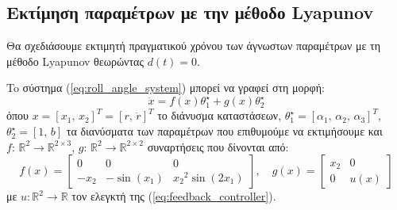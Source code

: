 \documentclass[a4paper,12pt]{article}
\begin{document}
\subsection*{Εκτίμηση παραμέτρων με την μέθοδο Lyapunov}

Θα σχεδιάσουμε εκτιμητή πραγματικού χρόνου των άγνωστων παραμέτρων με τη μέθοδο 
Lyapunov θεωρώντας $d(t) = 0$.

To σύστημα (\ref{eq:roll_angle_system}) μπορεί να γραφεί στη μορφή:
\begin{equation}
    \dot{x} = f(x)\theta_1^{\star} + g(x) \theta_2^{\star}
    \label{eq:eq:roll_angle_system_2}
\end{equation}
όπου $x = [x_1, \, x_2]^T = [r,\,\dot{r}]^T$ το διάνυσμα καταστάσεων, 
$\theta_1^{\star} = [\alpha_1,\,\alpha_2,\,\alpha_3]^T$, $\theta_2^{\star} = [1, \, b]$ τα διανύσματα των
παραμέτρων που επιθυμούμε να εκτιμήσουμε και $f:\, \mathbb{R}^2 \to \mathbb{R}^{2 \times 3}$, 
$g:\, \mathbb{R}^2 \to \mathbb{R}^{2 \times 2}$ συναρτήσεις που δίνονται από:
\begin{equation}
    f(x) = 
    \begin{bmatrix}
        0 & 0 & 0 \\
        -x_2 & - \sin(x_1) & {x_2}^2 \sin(2 x_1)
    \end{bmatrix}, \quad
    g(x) = 
    \begin{bmatrix}
        x_2 & 0 \\
        0 & u(x)
    \end{bmatrix}
    \label{eq:nonlinear_matrices}
\end{equation}
με $u: \mathbb{R}^2 \to \mathbb{R}$ τον ελεγκτή της (\ref{eq:feedback_controller}).
\end{document}
